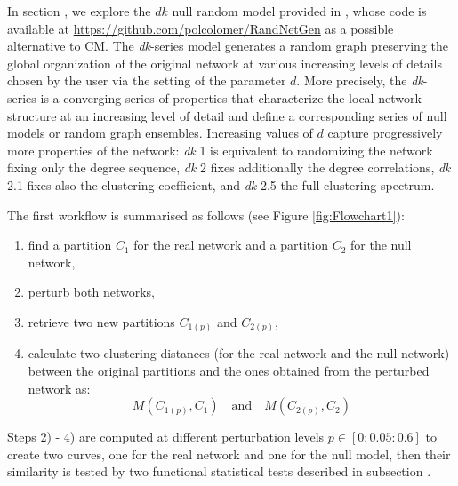 In section \textbf{}, we explore the $dk$ null random model provided in 
\cite{Orsini_et_al:2015}, whose code is available at \url{https://github.com/polcolomer/RandNetGen} as a possible alternative to CM.
The {\it dk}-series model generates a random graph preserving the global organization of the original network at various increasing levels of details chosen by the user via the setting of the parameter $d$. More precisely, the {\it dk}-series is a converging series of properties that characterize the local network structure at an increasing level of detail and define a corresponding series of null models or random graph ensembles. 
Increasing values of $d$ capture progressively more properties of the network:  {\it dk} 1 is equivalent to randomizing the network fixing only the degree sequence, {\it dk} 2 fixes additionally the degree correlations, {\it dk} 2.1 fixes also the clustering coefficient, and {\it dk} 2.5 the full clustering spectrum.




The first workflow is summarised as follows (see Figure \ref{fig:Flowchart1}):

\begin{enumerate}
\item find a partition $C_1$ for the real network and a partition $C_2$ for the null network, 
\item perturb both networks, 
\item retrieve two new partitions $C_{1(p)}$ and $C_{2(p)}$, 
\item calculate two clustering distances (for the real network and the null network) between the original partitions and the ones obtained from the perturbed network as:
\begin{equation}
M\left(C_{1\left(p\right)},C_1\right) \quad \mathrm{and} \quad M\left(C_{2\left(p\right)},C_2\right)  
\end{equation}
\end{enumerate}
Steps 2) - 4) are computed at different perturbation levels $p \in [0:0.05:0.6]$ to create two curves, one for the real network and one for the null model, then their similarity is tested by two functional statistical tests described in subsection \textbf{}.

